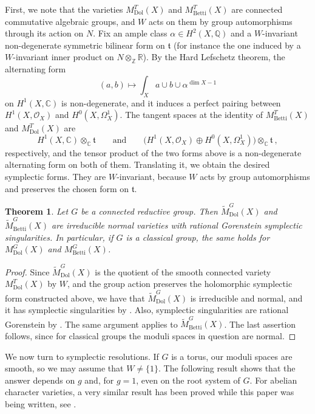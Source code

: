 \documentclass[11pt, a4paper]{amsart}
\newtheorem{theorem}{Theorem}[section]
\theoremstyle{definition}
\theoremstyle{myitemstyle}
\newcommand{\R}{\mathbb{R}}
\newcommand{\Z}{\mathbb{Z}}
\newcommand{\Q}{\mathbb{Q}}
\newcommand{\C}{\mathbb{C}}
\newcommand{\mc}[1]{{\mathcal{#1}}}
\newcommand{\Dol}{{\mathrm{Dol}}}
\newcommand{\Betti}{{\mathrm{Betti}}}
\begin{document}
First, we note that the varieties $M^T_\Dol(X)$ and $M^T_\Betti(X)$ are connected commutative algebraic groups, and $W$ acts on them by group automorphisms through its action on $N$.  Fix an ample class $\alpha\in H^2(X,\Q)$ and a $W$-invariant non-degenerate symmetric bilinear form on $\mathfrak t$ (for instance the one induced by a $W$-invariant inner product on $N\otimes_\Z\R$). By the Hard Lefschetz theorem, the alternating form
\[
(a,b)\longmapsto\int_Xa\cup b\cup \alpha^{\dim X-1}
\]
on $H^1(X,\C)$ is non-degenerate, and it induces a perfect pairing between $H^1(X,\mc O_X)$ and $H^0(X,\Omega^1_X)$. The tangent spaces at the identity of $M^T_\Betti(X)$ and $M^T_\Dol(X)$ are
\[
H^1(X,\C)\otimes_\C\mathfrak t
\qquad\text{and}\qquad
\big(H^1(X,\mc O_X)\oplus H^0(X,\Omega^1_X)\big)\otimes_\C\mathfrak t\ ,
\]
respectively, and   the tensor product of the two forms above is a non-degenerate alternating form on both of them. Translating it, we obtain the desired symplectic forms. They are $W$-invariant, because $W$ acts by group automorphisms and preserves the chosen form on $\mathfrak t$.

\begin{theorem}
	\label{thm:symplectic-singularities-general}
	Let $G$ be a connected reductive group. Then $\widetilde M^G_\Dol(X)$ and $\widetilde M^G_\Betti(X)$ are irreducible normal varieties with rational Gorenstein symplectic singularities. In particular, if $G$ is a classical group, the same holds for $M^G_\Dol(X)$ and $M^G_\Betti(X)$.
\end{theorem}

\begin{proof}
	Since $\widetilde M^G_\Dol(X)$ is the quotient of the smooth connected variety $M^T_\Dol(X)$ by $W$, and the group action preserves the holomorphic symplectic form constructed above, we have that $\widetilde M^G_\Dol(X)$ is irreducible and normal, and it has symplectic singularities by \cite[Proposition 2.4]{Be00}. Also, symplectic singularities are rational Gorenstein by \cite[Proposition 1.3]{Be00}. The same argument applies to $\widetilde M^G_\Betti(X)$. The last assertion follows, since for classical groups the moduli spaces in question are normal.
\end{proof}

We now turn to symplectic resolutions. If $G$ is a torus, our  moduli spaces are smooth, so we may assume that $W\neq\{1\}$. The following result shows that the answer depends on $g$ and, for $g=1$, even on the root system of $G$. For abelian character varieties, a very similar result has been proved while this paper was being written, see \cite[Corollary~4.4 and Theorem~4.5]{FGPZ26}. 
\end{document}
